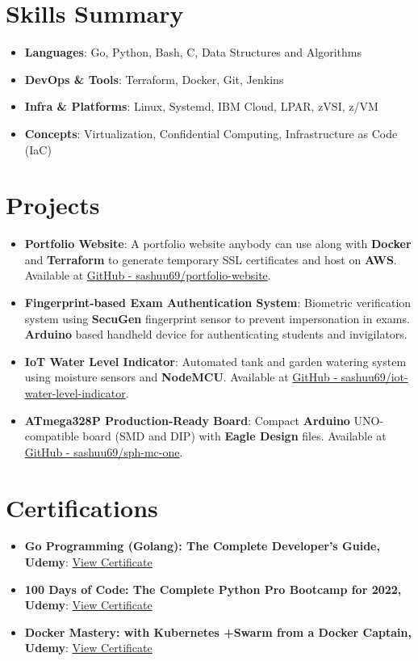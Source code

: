 \documentclass[a4paper,20pt]{article}
\newcommand{\resumeItem}[2]{
  \item\small{\textbf{#1}{: #2 \vspace{-2pt}}}
}
\newcommand{\resumeSubItem}[2]{\resumeItem{#1}{#2}\vspace{-3pt}}
\newcommand{\resumeSubHeadingListStart}{\begin{itemize}[leftmargin=*]}
\newcommand{\resumeSubHeadingListEnd}{\end{itemize}}
\begin{document}
\vspace{+5pt}
\section{Skills Summary}
    \resumeSubHeadingListStart
        \resumeSubItem{Languages}{Go, Python, Bash, C, Data Structures and Algorithms}
        \resumeSubItem{DevOps \& Tools}{Terraform, Docker, Git, Jenkins}
        \resumeSubItem{Infra \& Platforms}{Linux, Systemd, IBM Cloud, LPAR, zVSI, z/VM}
        \resumeSubItem{Concepts}{Virtualization, Confidential Computing, Infrastructure as Code (IaC)}
    \resumeSubHeadingListEnd

\vspace{+5pt}
\section{Projects}
    \resumeSubHeadingListStart
        \resumeSubItem
            {Portfolio Website}
            {A portfolio website anybody can use along with \textbf{Docker} and \textbf{Terraform} to generate temporary SSL certificates and host on \textbf{AWS}. Available at \href{https://github.com/sashuu69/portfolio-website}{GitHub - sashuu69/portfolio-website}.}
        \resumeSubItem
            {Fingerprint-based Exam Authentication System}
            {Biometric verification system using \textbf{SecuGen} fingerprint sensor to prevent impersonation in exams. \textbf{Arduino} based handheld device for authenticating students and invigilators.}
        \resumeSubItem
            {IoT Water Level Indicator}
            {Automated tank and garden watering system using moisture sensors and \textbf{NodeMCU}. Available at \href{https://github.com/sashuu69/iot-water-level-indicator}{GitHub - sashuu69/iot-water-level-indicator}.}
        \resumeSubItem
            {ATmega328P Production-Ready Board}
            {Compact \textbf{Arduino} UNO-compatible board (SMD and DIP) with \textbf{Eagle Design} files. Available at \href{https://github.com/sashuu69/sph-mc-one}{GitHub - sashuu69/sph-mc-one}.}
    \resumeSubHeadingListEnd

\vspace{+5pt}
\section{Certifications}
    \resumeSubHeadingListStart
        \resumeSubItem{Go Programming (Golang): The Complete Developer's Guide, Udemy}{\href{https://www.udemy.com/certificate/UC-f8cd19eb-11ac-4bea-9b96-6ae0e4c3895b/}{View Certificate}}
        \resumeSubItem{100 Days of Code: The Complete Python Pro Bootcamp for 2022, Udemy}{\href{https://www.udemy.com/certificate/UC-3b2d323f-3c3d-416b-be02-e5b760873b38/}{View Certificate}}
        \resumeSubItem{Docker Mastery: with Kubernetes +Swarm from a Docker Captain, Udemy}{\href{https://www.udemy.com/certificate/UC-f6a7aa7c-8752-43ad-a89b-af78aebeba68/}{View Certificate}}
    \resumeSubHeadingListEnd
\end{document}
